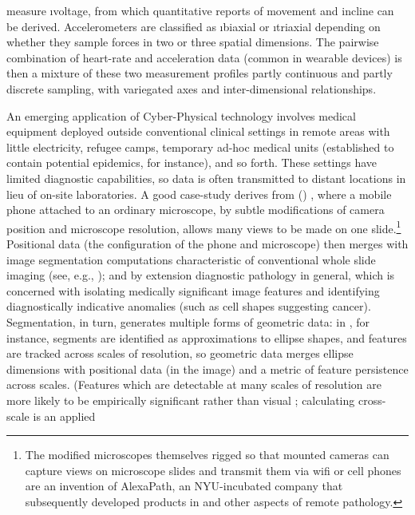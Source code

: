 {\begin{description}
measure \i{voltage}, from which quantitative reports 
of movement and incline can be derived.  Accelerometers are 
classified as \i{biaxial} or \i{triaxial} depending on 
whether they sample forces in two or three spatial 
dimensions.  
\pseudoIndent{}
The pairwise combination of heart-rate and acceleration data
(common in wearable devices) is then a mixture of these
two measurement profiles \mdash{} partly continuous and
partly discrete sampling, with variegated axes and
inter-dimensional relationships.  
\item[Remote Medical Diagnosis]  An emerging application of 
Cyber-Physical technology involves medical equipment 
deployed outside conventional clinical settings 
\mdash{} in remote areas with little electricity, refugee 
camps, temporary ad-hoc medical units (established 
to contain potential epidemics, for instance), and 
so forth.  These settings have limited diagnostic 
capabilities, so data is often transmitted to distant 
locations in lieu of on-site laboratories.  
\pseudoIndent{}
A good case-study derives from  
(\mWSI{}) \cite{Auguste}, where a mobile 
phone attached to an ordinary microscope, 
by subtle modifications of camera position and microscope 
resolution, allows many views to be made on one slide.\footnote{The modified microscopes themselves \mdash{} rigged so that 
mounted cameras can capture views on microscope slides and 
transmit them via wifi or cell phones \mdash{} are an invention 
of AlexaPath, an NYU-incubated company that subsequently 
developed products in \AI{} and other aspects of remote pathology. 
}  
Positional data (the configuration of the phone and microscope) 
then merges with image segmentation 
computations characteristic of 
conventional whole slide imaging (see, e.g., 
\cite{Farahani}); and by extension diagnostic pathology 
in general, which 
is concerned with isolating medically significant image 
features and identifying diagnostically indicative 
anomalies (such as cell shapes 
suggesting cancer). 
\pseudoIndent{}
Segmentation, in turn, 
generates multiple forms of geometric data: in 
\cite{KaleAksoy}, for instance, segments are 
identified as approximations to ellipse shapes, 
and features are tracked across scales of resolution, 
so geometric data merges ellipse dimensions with 
positional data (in the image) and a metric 
of feature persistence across scales.  
(Features which are detectable at many scales of 
resolution are more likely to be empirically 
significant rather than visual ; calculating 
cross-scale  is an applied 

\end{description}}
